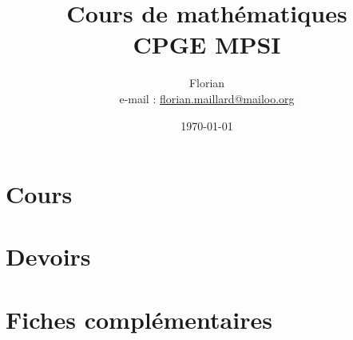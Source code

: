 \documentclass[10pt, a4paper, openright, twoside, fleqn, leqno]{book}
\title{\textbf{\Huge Cours de mathématiques \\ CPGE MPSI}}
\author{Florian \bsc{Maillard}\\ e-mail : \href{mailto:florian.maillard@mailoo.org}{florian.maillard@mailoo.org}}
\date{\today}
\begin{document}
\frontmatter
\maketitle
%
\mainmatter

\part{Cours}
































\part{Devoirs}
\renewcommand{\chaptername}{Devoir}

\appendix
\part{Fiches compl\'ementaires}










%
\backmatter%
\dominitoc%
\dominilof%
\dominilot%
\tableofcontents
\listoffigures
\listoftables
\end{document}

